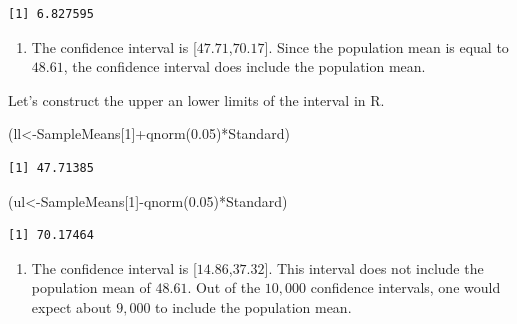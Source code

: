 \documentclass[
  letterpaper,
  DIV=11,
  numbers=noendperiod]{scrreprt}
\newenvironment{Shaded}{\begin{snugshade}}{\end{snugshade}}
\newcommand{\DecValTok}[1]{\textcolor[rgb]{0.68,0.00,0.00}{#1}}
\newcommand{\FloatTok}[1]{\textcolor[rgb]{0.68,0.00,0.00}{#1}}
\newcommand{\FunctionTok}[1]{\textcolor[rgb]{0.28,0.35,0.67}{#1}}
\newcommand{\NormalTok}[1]{\textcolor[rgb]{0.00,0.23,0.31}{#1}}
\newcommand{\OtherTok}[1]{\textcolor[rgb]{0.00,0.23,0.31}{#1}}
\newcommand{\SpecialCharTok}[1]{\textcolor[rgb]{0.37,0.37,0.37}{#1}}
\providecommand{\tightlist}{%
  \setlength{\itemsep}{0pt}\setlength{\parskip}{0pt}}\usepackage{longtable,booktabs,array}
\begin{document}
\begin{verbatim}
[1] 6.827595
\end{verbatim}

\begin{blackbox}

\begin{enumerate}
\def\labelenumi{\arabic{enumi}.}
\setcounter{enumi}{2}
\tightlist
\item
  The confidence interval is {[}\(47.71\),\(70.17\){]}. Since the
  population mean is equal to \(48.61\), the confidence interval does
  include the population mean.
\end{enumerate}

\end{blackbox}

Let's construct the upper an lower limits of the interval in R.

\begin{Shaded}
\begin{Highlighting}[numbers=left,,]
\NormalTok{(ll}\OtherTok{\textless{}{-}}\NormalTok{SampleMeans[}\DecValTok{1}\NormalTok{]}\SpecialCharTok{+}\FunctionTok{qnorm}\NormalTok{(}\FloatTok{0.05}\NormalTok{)}\SpecialCharTok{*}\NormalTok{Standard)}
\end{Highlighting}
\end{Shaded}

\begin{verbatim}
[1] 47.71385
\end{verbatim}

\begin{Shaded}
\begin{Highlighting}[numbers=left,,]
\NormalTok{(ul}\OtherTok{\textless{}{-}}\NormalTok{SampleMeans[}\DecValTok{1}\NormalTok{]}\SpecialCharTok{{-}}\FunctionTok{qnorm}\NormalTok{(}\FloatTok{0.05}\NormalTok{)}\SpecialCharTok{*}\NormalTok{Standard)}
\end{Highlighting}
\end{Shaded}

\begin{verbatim}
[1] 70.17464
\end{verbatim}

\begin{blackbox}

\begin{enumerate}
\def\labelenumi{\arabic{enumi}.}
\setcounter{enumi}{3}
\tightlist
\item
  The confidence interval is {[}\(14.86\),\(37.32\){]}. This interval
  does not include the population mean of \(48.61\). Out of the
  \(10,000\) confidence intervals, one would expect about \(9,000\) to
  include the population mean.
\end{enumerate}

\end{blackbox}
\end{document}
